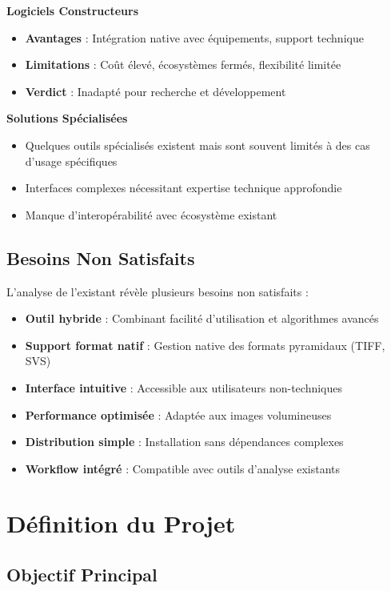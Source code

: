\documentclass[12pt,a4paper]{report}
\begin{document}
\textbf{Logiciels Constructeurs}
\begin{itemize}
\item \textbf{Avantages} : Intégration native avec équipements, support technique
\item \textbf{Limitations} : Coût élevé, écosystèmes fermés, flexibilité limitée
\item \textbf{Verdict} : Inadapté pour recherche et développement
\end{itemize}

\textbf{Solutions Spécialisées}
\begin{itemize}
\item Quelques outils spécialisés existent mais sont souvent limités à des cas d'usage spécifiques
\item Interfaces complexes nécessitant expertise technique approfondie
\item Manque d'interopérabilité avec écosystème existant
\end{itemize}

\subsection{Besoins Non Satisfaits}

L'analyse de l'existant révèle plusieurs besoins non satisfaits :

\begin{itemize}
\item \textbf{Outil hybride} : Combinant facilité d'utilisation et algorithmes avancés
\item \textbf{Support format natif} : Gestion native des formats pyramidaux (TIFF, SVS)
\item \textbf{Interface intuitive} : Accessible aux utilisateurs non-techniques
\item \textbf{Performance optimisée} : Adaptée aux images volumineuses
\item \textbf{Distribution simple} : Installation sans dépendances complexes
\item \textbf{Workflow intégré} : Compatible avec outils d'analyse existants
\end{itemize}

\section{Définition du Projet}

\subsection{Objectif Principal}
\end{document}
